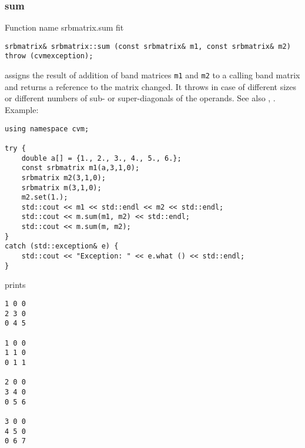 \subsubsection{sum}
Function%
\pdfdest name {srbmatrix.sum} fit
\begin{verbatim}
srbmatrix& srbmatrix::sum (const srbmatrix& m1, const srbmatrix& m2)
throw (cvmexception);
\end{verbatim}
assigns the result of addition of
band matrices \verb"m1" and \verb"m2"  to a calling band matrix
and returns a reference to
the matrix changed.
It throws  
in case of different sizes or different numbers of sub- or super-diagonals
of the operands.
See also ,
.
Example:
\begin{Verbatim}
using namespace cvm;

try {
    double a[] = {1., 2., 3., 4., 5., 6.};
    const srbmatrix m1(a,3,1,0);
    srbmatrix m2(3,1,0);
    srbmatrix m(3,1,0);
    m2.set(1.);
    std::cout << m1 << std::endl << m2 << std::endl;
    std::cout << m.sum(m1, m2) << std::endl;
    std::cout << m.sum(m, m2);
}
catch (std::exception& e) {
    std::cout << "Exception: " << e.what () << std::endl;
}
\end{Verbatim}
prints
\begin{Verbatim}
1 0 0
2 3 0
0 4 5

1 0 0
1 1 0
0 1 1

2 0 0
3 4 0
0 5 6

3 0 0
4 5 0
0 6 7
\end{Verbatim}
\newpage






